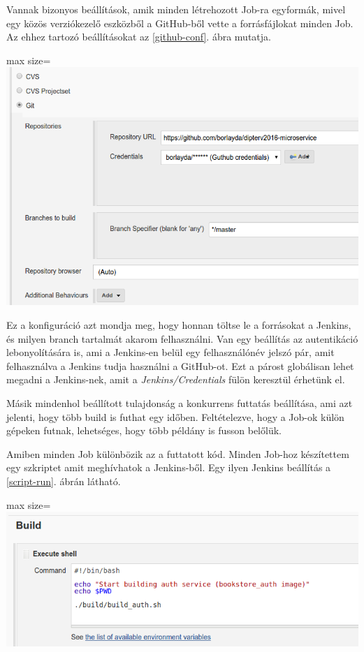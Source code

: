 \documentclass[11pt,magyar,a4paper,twoside,]{report}
\let\Oldincludegraphics\includegraphics
\renewcommand{\includegraphics}[1]{
\begin{adjustbox}{max size={\textwidth}{\textheight}}
    \Oldincludegraphics[scale=0.6]{#1}%
\end{adjustbox}
}
\begin{document}
Vannak bizonyos beállítások, amik minden létrehozott Job-ra egyformák,
mivel egy közös verziókezelő eszközből a GitHub-ből vette a
forrásfájlokat minden Job. Az ehhez tartozó beállításokat az
\ref{github-conf}. ábra mutatja.

\includegraphics{img/github-config.png}\label{github-conf}

Ez a konfiguráció azt mondja meg, hogy honnan töltse le a forrásokat a
Jenkins, és milyen branch tartalmát akarom felhasználni. Van egy
beállítás az autentikáció lebonyolítására is, ami a Jenkins-en belül egy
felhasználónév jelszó pár, amit felhasználva a Jenkins tudja használni a
GitHub-ot. Ezt a párost globálisan lehet megadni a Jenkins-nek, amit a
\emph{Jenkins/Credentials} fülön keresztül érhetünk el.

Másik mindenhol beállított tulajdonság a konkurrens futtatás beállítása,
ami azt jelenti, hogy több build is futhat egy időben. Feltételezve,
hogy a Job-ok külön gépeken futnak, lehetséges, hogy több példány is
fusson belőlük.

Amiben minden Job különbözik az a futtatott kód. Minden Job-hoz
készítettem egy szkriptet amit meghívhatok a Jenkins-ből. Egy ilyen
Jenkins beállítás a \ref{script-run}. ábrán látható.

\includegraphics{img/script-run.png}\label{script-run}
\end{document}
